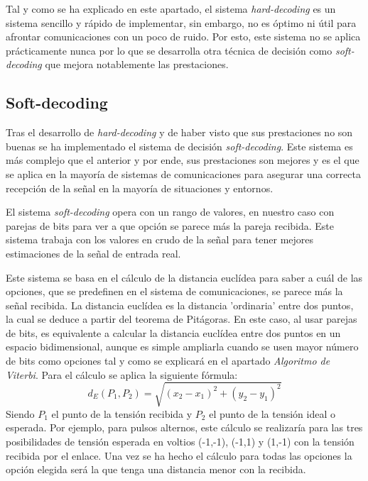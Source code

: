 Tal y como se ha explicado en este apartado, el sistema \textit{hard-decoding} es 
un sistema sencillo y rápido de implementar, sin embargo, no es 
óptimo ni útil para afrontar comunicaciones con un poco de ruido. Por esto, este sistema
no se aplica prácticamente nunca por lo que 
se desarrolla otra técnica de decisión como \textit{soft-decoding} que mejora notablemente
las prestaciones.

\subsection{Soft-decoding}
Tras el desarrollo de \textit{hard-decoding} y de haber visto que sus prestaciones no son 
buenas se ha implementado el sistema de decisión \textit{soft-decoding}. 
Este sistema es más complejo que el anterior y por ende, sus prestaciones son mejores y 
es el que se aplica en la mayoría de sistemas de comunicaciones para asegurar una 
correcta recepción de la señal en la mayoría de situaciones y entornos.

El sistema \textit{soft-decoding} opera con un rango de valores, en nuestro caso con 
parejas de bits para ver a que opción se parece más la pareja recibida. Este sistema 
trabaja con los valores en crudo de la señal para tener mejores estimaciones de la señal
de entrada real. 

Este sistema se basa en el cálculo de la distancia euclídea 
para saber a cuál de las opciones, que se predefinen en el sistema de 
comunicaciones, se parece más la señal recibida. La distancia euclídea es la 
distancia 'ordinaria' entre dos puntos, la cual se deduce a partir del teorema de 
Pitágoras. En este caso, al usar parejas de bits, es equivalente a calcular la distancia
euclídea entre dos puntos en un espacio bidimensional, aunque es simple ampliarla cuando se 
usen mayor número de bits como opciones tal y como se explicará en el apartado 
\textit{Algoritmo de Viterbi}. Para el cálculo se aplica la siguiente fórmula:
\[ d_E(P_1,P_2) = \sqrt{(x_2 - x_1)^2 + (y_2 - y_1)^2} \] 
Siendo $P_1$ el punto de la tensión recibida y $P_2$ el punto de la tensión ideal 
o esperada. Por ejemplo, para pulsos alternos, este cálculo se realizaría para las 
tres posibilidades de tensión esperada en voltios (-1,-1), (-1,1) y (1,-1) con la 
tensión recibida por el enlace. Una vez se ha hecho el cálculo para todas las opciones
la opción elegida será la que tenga una distancia menor con la recibida.

